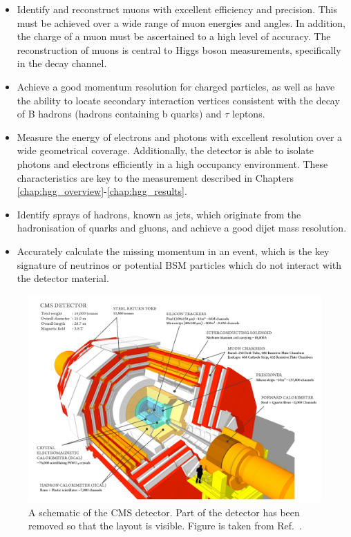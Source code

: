 \begin{itemize}
    \item Identify and reconstruct muons with excellent efficiency and precision. This must be achieved over a wide range of muon energies and angles. In addition, the charge of a muon must be ascertained to a high level of accuracy. The reconstruction of muons is central to Higgs boson measurements, specifically in the \Hfl decay channel.
    \item Achieve a good momentum resolution for charged particles, as well as have the ability to locate secondary interaction vertices consistent with the decay of B hadrons (hadrons containing b quarks) and $\tau$ leptons.
    \item Measure the energy of electrons and photons with excellent resolution over a wide geometrical coverage. Additionally, the detector is able to isolate photons and electrons efficiently in a high occupancy environment. These characteristics are key to the \Hgg measurement described in Chapters \ref{chap:hgg_overview}-\ref{chap:hgg_results}.
    \item Identify sprays of hadrons, known as jets, which originate from the hadronisation of quarks and gluons, and achieve a good dijet mass resolution.
    \item Accurately calculate the missing momentum in an event, which is the key signature of neutrinos or potential BSM particles which do not interact with the detector material.
\end{itemize}

\begin{figure}
  \centering
  \includegraphics[width=1\textwidth]{Figures/cms/cms_detector.pdf}
  \caption[The CMS detector]
  {
    A schematic of the CMS detector. Part of the detector has been removed so that the layout is visible. Figure is taken from Ref.~\cite{Sakuma_2014}.
  }
  \label{fig:cms_detector}
\end{figure}

